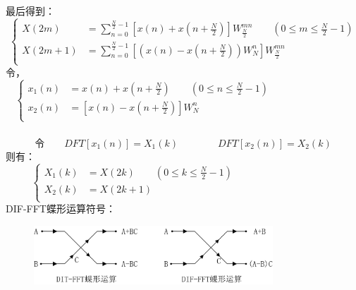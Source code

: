 \documentclass[notheorems,compress,mathserif,table]{beamer}
\begin{document}
\begin{frame}\frametitle{}%


最后得到：
\begin{equation*} \label{eq:2}
\left \{
\begin{aligned}
    X(2m)\quad &= \sum_{n=0}^{\frac{N}{2}-1}\left[x(n)+x(n+\frac{N}{2})\right]W_{\frac{N}{2}}^{mn} \quad\quad(0\leq m\leq\frac{N}{2}-1)\\
    X(2m+1)    &= \sum_{n=0}^{\frac{N}{2}-1}\left[(x(n)-x(n+\frac{N}{2}))W_N^n \right]W_{\frac{N}{2}}^{mn}\\
\end{aligned}
\right.
\end{equation*}
令，
$$
\left \{
\begin{aligned}
    x_1(n)&= x(n)+x(n+\frac{N}{2})\quad\quad(0\leq n\leq\frac{N}{2}-1)\quad\quad\quad\quad\quad\quad\quad\quad\\
    x_2(n)&= \left[x(n)-x(n+\frac{N}{2})\right]W_N^n\\
\end{aligned}
\right.
$$
\end{frame}
\begin{frame}\frametitle{}%
$$\mbox{令}\quad\quad DFT[x_1(n)]=X_1(k)\quad\quad\quad\quad DFT\left[x_2(n)\right]=X_2(k)$$
则有：
$$
\left \{
\begin{aligned}
    X_1(k)&= X(2k)\quad\quad(0\leq k\leq\frac{N}{2}-1)
    \quad\quad\quad\quad\quad\quad\quad\quad\quad\quad\\
    X_2(k)&= X(2k+1)\\
\end{aligned}
\right.
$$
DIF-FFT蝶形运算符号：
\begin{figure}[h]
  \centering
  \includegraphics[width=0.8\textwidth]{Diffftdiexing.jpg}
\end{figure}
\end{frame}
\end{document}
